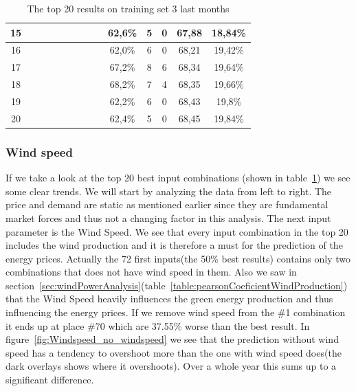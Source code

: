 \begin{table}[H]
{\begin{tabular}{|c|c|c|c|c|c|c|c|c|c|c|c|c|c|}
15 &  \x    & \x    & \x    & \x    & \x    & \x    &       &       & 62,6\% &  5  & 0  & 67,88 & 18,84\% \\ \hline
16 &  \x    & \x    & \x    &       & \x    & \x    &       & \x    & 62,0\% &  6  & 0  & 68,21 & 19,42\% \\ \hline
17 &  \x    & \x    & \x    &       & \x\m  & \x\m  &       &       & 67,2\% &  8  & 6  & 68,34 & 19,64\% \\ \hline
18 &  \x    & \x    & \x    &       & \x\m  &       &       & \x\m  & 68,2\% &  7  & 4  & 68,35 & 19,66\% \\ \hline
19 &  \x    & \x    & \x    & \x    & \x    & \x    & \x    &       & 62,2\% &  6  & 0  & 68,43 & 19,8\% \\ \hline
20 &  \x    & \x    & \x    & \x    & \x    &       &       & \x\m  & 62,4\% &  5  & 0  & 68,45 & 19,84\% \\ \hline
\end{tabular}
}
\caption{The top 20 results on training set 3 last months} %
\label{table:Top20Prices} %
\end{table}

\subsubsection{Wind speed}
If we take a look at the top 20 best input combinations (shown in table~\ref{table:Top20Prices}) we see some clear trends. We will start by analyzing the data from left to right. The price and demand are static as mentioned earlier since they are fundamental market forces and thus not a changing factor in this analysis. The next input parameter is the Wind Speed. We see that every input combination in the top 20 includes the wind production and it is therefore a must for the prediction of the energy prices. Actually the 72 first inputs(the 50\% best results) contains only two combinations that does not have wind speed in them. Also we saw in section~\ref{sec:windPowerAnalysis}(table~\ref{table:pearsonCoeficientWindProduction}) that the Wind Speed heavily influences the green energy production and thus influencing the energy prices. If we remove wind speed from the \#1 combination it ends up at place \#70 which are 37.55\% worse than the best result. In figure~\ref{fig:Windspeed_no_windspeed} we see that the prediction without wind speed has a tendency to overshoot more than the one with wind speed does(the dark overlays shows where it overshoots). Over a whole year this sums up to a significant difference.

